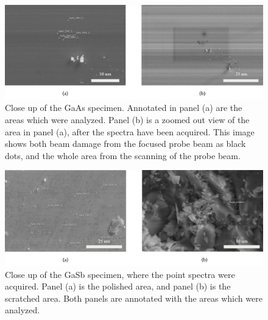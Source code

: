 \begin{figure}[htbp]
    \centering
    \includegraphics[width=.95\textwidth]{figures/SE_images/GaAs_close.jpg}
    \caption{
        Close up of the GaAs specimen.
        Annotated in panel (a) are the areas which were analyzed.
        Panel (b) is a zoomed out view of the area in panel (a), after the spectra have been acquired.
        This image shows both beam damage from the focused probe beam as black dots, and the whole area from the scanning of the probe beam.
    }
    \label{fig:SE_images:GaAs}
\end{figure}


\begin{figure}[htbp]
    \centering
    \includegraphics[width=.95\textwidth]{figures/SE_images/GaSb_close.jpg}
    \caption{
        Close up of the GaSb specimen, where the point spectra were acquired.
        Panel (a) is the polished area, and panel (b) is the scratched area.
        Both panels are annotated with the areas which were analyzed.
    }
    \label{fig:SE_images:GaSb}
\end{figure}






